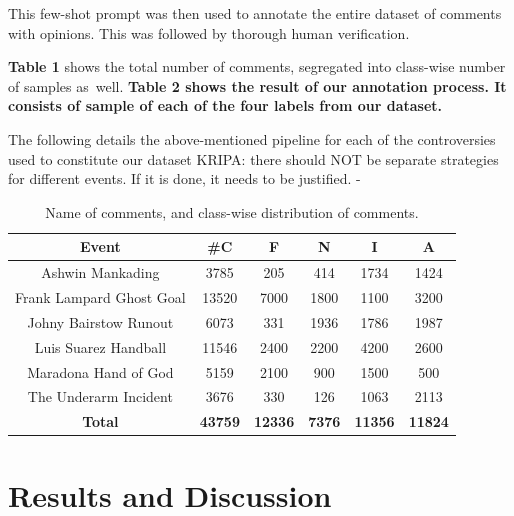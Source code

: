 \documentclass[sigconf, review]{acmart}
\begin{document}
This few-shot prompt was then used to annotate the entire dataset of comments with opinions. This was followed by thorough human verification.

\textbf{Table 1} shows the total number of comments, segregated into class-wise number of samples as well.
\textbf{Table 2 shows the result of our annotation process. It consists of sample of each of the four labels from our dataset.}

The following details the above-mentioned pipeline for each of the controversies used to constitute our dataset {\color{red}KRIPA: there should NOT be separate strategies for different events. If it is done, it needs to be justified}. - 

\begin{table}[h]
    \centering
    \small
    {
    \begin{tabular}{|c|c|c|c|c|c|} 
        \hline
        \textbf{Event} & \textbf{\#C} & \textbf{F} & \textbf{N} & \textbf{I} & \textbf{A} \\ 
        \hline
        Ashwin Mankading  & 3785  & 205 & 414 & 1734 & 1424 \\  
        Frank Lampard Ghost Goal & 13520 & 7000 & 1800 & 1100 & 3200 \\
        Johny Bairstow Runout & 6073 & 331 & 1936 & 1786 & 1987 \\
        Luis Suarez Handball & 11546 & 2400 & 2200 & 4200 & 2600 \\
        Maradona Hand of God & 5159 & 2100 & 900 & 1500 & 500 \\
        The Underarm Incident & 3676 & 330 & 126 & 1063 & 2113 \\
        \hline
        \textbf{Total} & \textbf{43759} & \textbf{12336} & \textbf{7376} & \textbf{11356} & \textbf{11824} \\
        \hline
    \end{tabular}
    }
    \caption{Name of comments, and class-wise distribution of comments.}
    \label{tab:merged_controversies}
\end{table}

\section{Results and Discussion}\label{sec:res_discuss}
\end{document}
